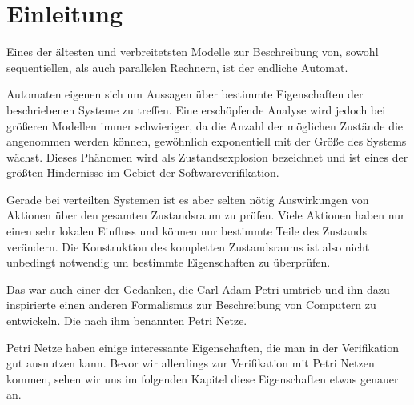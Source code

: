 \chapter{Einleitung}
\label{introduction}
Eines der ältesten und verbreitetsten Modelle zur Beschreibung von, sowohl sequentiellen, als auch parallelen Rechnern, ist der endliche Automat.

Automaten eigenen sich um Aussagen über bestimmte Eigenschaften der beschriebenen Systeme zu treffen.
Eine erschöpfende Analyse wird jedoch bei größeren Modellen immer schwieriger, da die Anzahl der möglichen Zustände die angenommen werden können, gewöhnlich exponentiell mit der Größe des Systems wächst.
Dieses Phänomen wird als Zustandsexplosion bezeichnet und ist eines der größten Hindernisse im Gebiet der Softwareverifikation.

Gerade bei verteilten Systemen ist es aber selten nötig Auswirkungen von Aktionen über den gesamten Zustandsraum zu prüfen.
Viele Aktionen haben nur einen sehr lokalen Einfluss und können nur bestimmte Teile des Zustands verändern.
Die Konstruktion des kompletten Zustandsraums ist also nicht unbedingt notwendig um bestimmte Eigenschaften zu überprüfen.

Das war auch einer der Gedanken, die Carl Adam Petri umtrieb und ihn dazu inspirierte einen anderen Formalismus zur Beschreibung von Computern zu entwickeln.
Die nach ihm benannten Petri Netze.

Petri Netze haben einige interessante Eigenschaften, die man in der Verifikation gut ausnutzen kann.
Bevor wir allerdings zur Verifikation mit Petri Netzen kommen, sehen wir uns im folgenden Kapitel diese Eigenschaften etwas genauer an.

